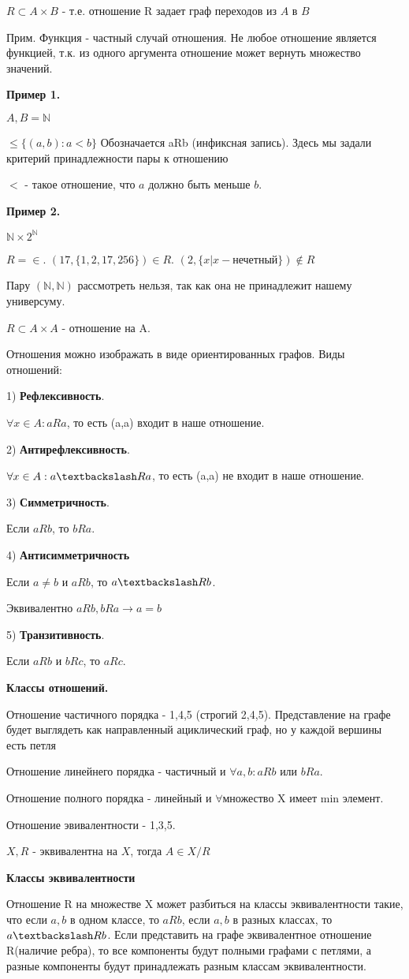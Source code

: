 $R \subset A \times B$ - т.е. отношение R задает граф переходов из $A$ в $B$

Прим. Функция - частный случай отношения. Не любое отношение является функцией, т.к. из одного аргумента отношение может вернуть множество значений.

\textbf{Пример 1.}

$A,B = \mathds{N}$

$\le \{(a,b): a<b\}$ Обозначается aRb (инфиксная запись). Здесь мы задали критерий принадлежности пары к отношению

$<$ - такое отношение, что $a$ должно быть меньше $b$.

\textbf{Пример 2.}

$\mathds{N} \times 2^\mathds{N}$

$R = \in $. $(17, \{1, 2, 17, 256\}) \in R$. $(2, \{x | x - \text{нечетный}\}) \notin R$

Пару $(\mathds{N}, \mathds{N})$ рассмотреть нельзя, так как она не принадлежит нашему универсуму.



$R \subset A \times A$ - отношение на A.

Отношения можно изображать в виде ориентированных графов.
Виды отношений: 

1) \textbf{Рефлексивность}.

$\forall x \in A: aRa$, то есть (a,a) входит в наше отношение.

2) \textbf{Антирефлексивность}.

$\forall x \in A: a\textbackslash Ra$, то есть (a,a) не входит в наше отношение.

3) \textbf{Симметричность}.

Если $aRb$, то $bRa$.

4) \textbf{Антисимметричность} 

Если $a\neq b$ и $aRb$, то $a\textbackslash Rb$.

Эквивалентно $aRb, bRa \rightarrow a=b$

5) \textbf{Транзитивность}.

Если $aRb$ и $bRc$, то $aRc$.

\textbf{Классы отношений.}

Отношение частичного порядка - 1,4,5 (строгий 2,4,5). Представление на графе будет выглядеть как направленный ациклический граф, но у каждой вершины есть петля

Отношение линейнего порядка - частичный и $\forall a,b: aRb$ или $bRa$.

Отношение полного порядка - линейный и $\forall $множество X имеет min элемент.

Отношение эвивалентности - 1,3,5.

$X,R$ - эквивалентна на $X$, тогда $A\in X /R$

\textbf{Классы эквивалентности}

Отношение R на множестве X может разбиться на классы эквивалентности такие, что если $a, b$ в одном классе, то  $aRb$, если $a, b$ в разных классах, то $a\textbackslash Rb$. Если представить на графе эквивалентное отношение R(наличие ребра), то все компоненты будут полными графами с петлями, а разные компоненты будут принадлежать разным классам эквивалентности.
